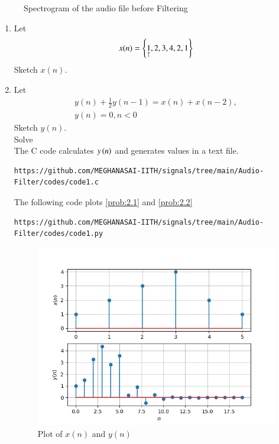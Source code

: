 \documentclass[journal,12pt,twocolumn]{IEEEtran}
\theoremstyle{remark}
\begin{document}
\begin{enumerate}[label=\thesection.\arabic*,ref=\thesection.\theenumi]
\begin{figure}[H]
    \caption{Spectrogram of the audio file before Filtering}
    \label{fig:after_filter_plot}
\end{figure}
\end{enumerate}
\begin{enumerate}[label=\thesection.\arabic*,ref=\thesection.\theenumi]
\section{Difference Equation}
\item Let
\begin{equation}
x(n) = \left\{\underset{\uparrow}{1},2,3,4,2,1\right\} \label{prob:2.1}
\end{equation}
Sketch $x(n)$. 
\item Let
\begin{multline}
y(n) + \frac{1}{2}y(n-1) = x(n) + x(n-2), 
\\
y(n) = 0, n < 0 \label{prob:2.2}
\end{multline}
Sketch $y(n)$.\\
Solve\\
\solution  The C code calculates $y\left(n\right)$  and generates values in a text file.
\begin{lstlisting}
https://github.com/MEGHANASAI-IITH/signals/tree/main/Audio-Filter/codes/code1.c
\end{lstlisting} 
The following code plots \eqref{prob:2.1} and \eqref{prob:2.2}
\begin{lstlisting}
https://github.com/MEGHANASAI-IITH/signals/tree/main/Audio-Filter/codes/code1.py
\end{lstlisting}

\begin{figure}[H]
	\centering
	\includegraphics[width=\columnwidth]{figs/Plot_xn_yn.png}
	\caption{Plot of $x(n)$ and $y(n)$}
	\label{fig:xnyn}
\end{figure}
\end{enumerate}
\end{document}
